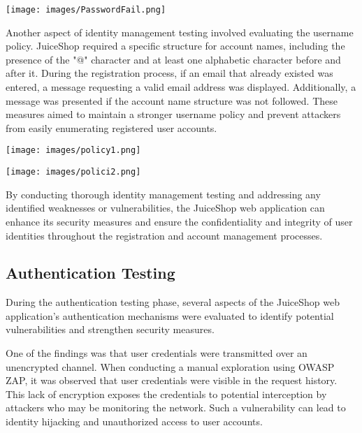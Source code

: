 \documentclass[12pt]{article}
\begin{document}
\begin{center}
    \texttt{[image: images/PasswordFail.png]}
\end{center}

\newpage

Another aspect of identity management testing involved evaluating the username policy. JuiceShop required a specific structure for account names, including the presence of the "@" character and at least one alphabetic character before and after it. During the registration process, if an email that already existed was entered, a message requesting a valid email address was displayed. Additionally, a message was presented if the account name structure was not followed. These measures aimed to maintain a stronger username policy and prevent attackers from easily enumerating registered user accounts.

\begin{center}
    \texttt{[image: images/policy1.png]}
\end{center}

\begin{center}
    \texttt{[image: images/polici2.png]}
\end{center}

\newpage

By conducting thorough identity management testing and addressing any identified weaknesses or vulnerabilities, the JuiceShop web application can enhance its security measures and ensure the confidentiality and integrity of user identities throughout the registration and account management processes.

\subsection{Authentication Testing}

During the authentication testing phase, several aspects of the JuiceShop web application's authentication mechanisms were evaluated to identify potential vulnerabilities and strengthen security measures.

One of the findings was that user credentials were transmitted over an unencrypted channel. When conducting a manual exploration using OWASP ZAP, it was observed that user credentials were visible in the request history. This lack of encryption exposes the credentials to potential interception by attackers who may be monitoring the network. Such a vulnerability can lead to identity hijacking and unauthorized access to user accounts.
\end{document}
